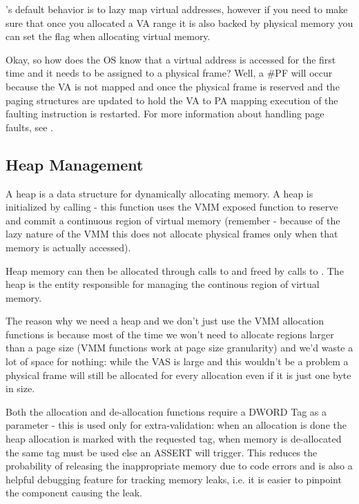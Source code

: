 \begin{appendices}
\projectname's default behavior is to lazy map virtual addresses, however if you need to make sure
that once you allocated a VA range it is also backed by physical memory you can set the
 flag when allocating virtual memory.

Okay, so how does the OS know that a virtual address is accessed for the first time and it needs to
be assigned to a physical frame? Well, a \#PF will occur because the VA is not mapped and once the
physical frame is reserved and the paging structures are updated to hold the VA to PA mapping
execution of the faulting instruction is restarted. For more information about handling page faults,
see .

\subsection{Heap Management}

A heap is a data structure for dynamically allocating memory. A heap is initialized by calling
 - this function uses the VMM exposed function  to
reserve and commit a continuous region of virtual memory (remember - because of the lazy nature of
the VMM this does not allocate physical frames only when that memory is actually accessed).

Heap memory can then be allocated through calls to  and freed by calls
to . The heap is the entity responsible for managing the continous region
of virtual memory.

The reason why we need a heap and we don't just use the VMM allocation functions is because most of
the time we won't need to allocate regions larger than a page size (VMM functions work at page size
granularity) and we'd waste a lot of space for nothing: while the VAS is large and this wouldn't be
a problem a physical frame will still be allocated for every allocation even if it is just one byte
in size.

Both the allocation and de-allocation functions require a DWORD Tag as a parameter - this is used
only for extra-validation: when an allocation is done the heap allocation is marked with the
requested tag, when memory is de-allocated the same tag must be used else an ASSERT will trigger.
This reduces the probability of releasing the inappropriate memory due to code errors and is also a
helpful debugging feature for tracking memory leaks, i.e. it is easier to pinpoint the component
causing the leak.


\end{appendices}
